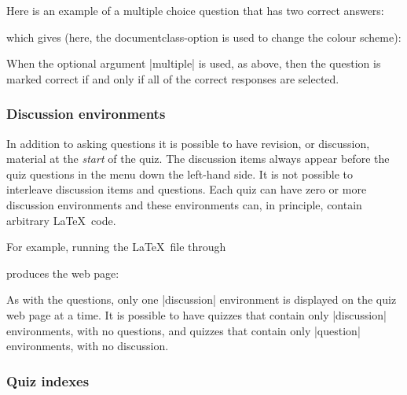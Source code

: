 \documentclass[svgnames]{article}
\begin{document}

Here is an example of a multiple choice question that has
two correct answers:

  \label{choice-multiple}

  \noindent which gives (here, the documentclass-option
   is used to change the colour scheme):


When the optional argument \LatexCode|multiple| is used, as above, then the
question is marked correct if and only if all of the correct responses
are selected.

  \subsubsection{Discussion environments}

In addition to asking questions it is possible to have revision, or
discussion, material at the \textit{start} of the quiz.  The discussion
items always appear before the quiz questions in the menu down the
left-hand side. It is not possible to interleave discussion items and
questions. Each quiz can have zero or more discussion environments and
these environments can, in principle, contain arbitrary \LaTeX\ code.

For example, running the \LaTeX\ file through \WebQuiz


produces the web page:


As with the questions, only one \LatexCode|discussion| environment is
displayed on the quiz web page at a time. It is possible to have quizzes
that contain only \LatexCode|discussion| environments, with no questions, and
quizzes that contain only \LatexCode|question| environments, with no
discussion.

  \subsubsection{Quiz indexes}

\end{document}

